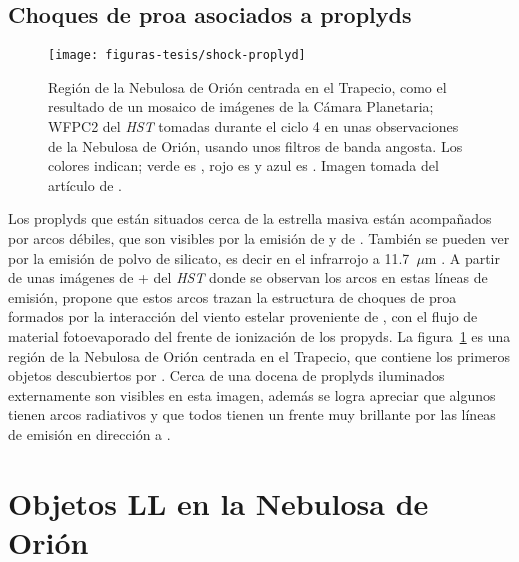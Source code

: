 \subsection{Choques de proa asociados a proplyds}
\label{sec:shock-proply}

\begin{figure}
  \centering
   \texttt{[image: figuras-tesis/shock-proplyd]}          
  \caption{Región de la Nebulosa de Orión centrada en el Trapecio, como el resultado de un mosaico de imágenes de la Cámara Planetaria; WFPC2 del \textit{HST} tomadas durante el ciclo 4 en unas observaciones de la Nebulosa de Orión, usando unos filtros de banda angosta. Los colores indican; verde es \ha{}, rojo es \nii{} y azul es \oi{}. Imagen tomada del artículo de \citet{Bally:1998a}.}
  \label{fig:shock-proplyd}
\end{figure}

Los proplyds que están situados cerca de la estrella masiva \thC{} están acompañados por arcos débiles, que son visibles por la emisión de \oiii{} y de \ha{}. También se pueden ver por la emisión de polvo de silicato, es decir en el infrarrojo a 11.7~\(\mu \text{m}\) \citep{Arredondo:2001, Hayward:1994}. A partir de unas imágenes de \ha{}+\nii{}  del \textit{HST} donde se observan los arcos en estas líneas de emisión, \citet{Bally:1998a} propone que estos arcos trazan la estructura de choques de proa formados por la interacción del viento estelar proveniente de \thC{}, con el flujo de material fotoevaporado del frente de ionización de los propyds. La figura~\ref{fig:shock-proplyd} es una región de la Nebulosa de Orión centrada en el Trapecio, que contiene los primeros objetos descubiertos por \citet{Laques:1979}. Cerca de una docena de proplyds iluminados externamente son visibles en esta imagen, además se logra apreciar que algunos tienen arcos radiativos y que todos tienen un frente muy brillante por las líneas de emisión en dirección a \thC{}.         

\section{Objetos LL  en la  Nebulosa de Orión}
\label{sec:objeto-ll}


